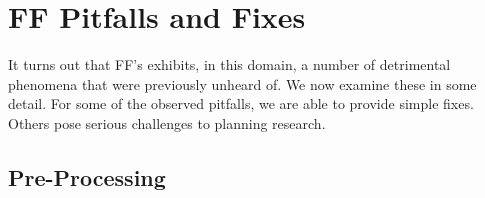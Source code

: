 




\section{FF Pitfalls and Fixes}
\label{sec:crisp-ff}







It turns out that FF's exhibits, in this domain, a number of
detrimental phenomena that were previously unheard of. We now examine
these in some detail.  For some of the observed pitfalls, we are able
to provide simple fixes. Others pose serious challenges to planning
research.













\subsection{Pre-Processing}
\label{sec:crisp-ff:preprocess}







